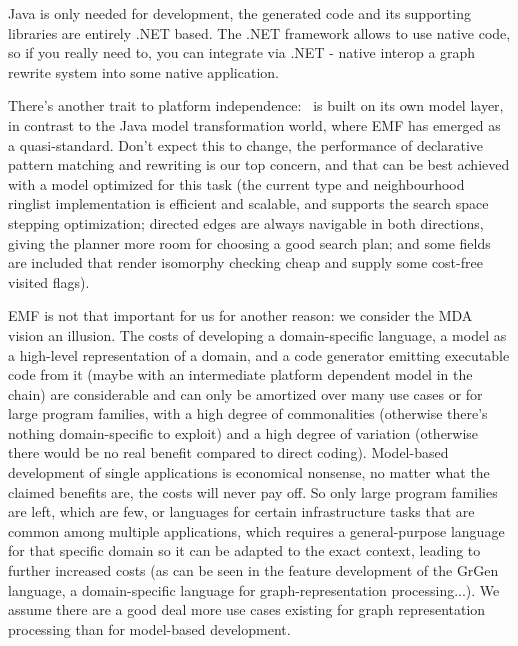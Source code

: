 Java is only needed for development, the generated code and its supporting libraries are entirely .NET based.
The .NET framework allows to use native code, so if you really need to, you can integrate via .NET - native interop a graph rewrite system into some native application.

There's another trait to platform independence: \GrG\ is built on its own model layer, in contrast to the Java model transformation world, where EMF has emerged as a quasi-standard.
Don't expect this to change, the performance of declarative pattern matching and rewriting is our top concern, and that can be best achieved with a model optimized for this task (the current type and neighbourhood ringlist implementation is efficient and scalable, and supports the search space stepping optimization; directed edges are always navigable in both directions, giving the planner more room for choosing a good search plan; and some fields are included that render isomorphy checking cheap and supply some cost-free visited flags).

EMF is not that important for us for another reason: we consider the MDA vision an illusion.
The costs of developing a domain-specific language, a model as a high-level representation of a domain, and a code generator emitting executable code from it (maybe with an intermediate platform dependent model in the chain) are considerable and can only be amortized over many use cases or for large program families, with a high degree of commonalities (otherwise there's nothing domain-specific to exploit) and a high degree of variation (otherwise there would be no real benefit compared to direct coding).
Model-based development of single applications is economical nonsense, no matter what the claimed benefits are, the costs will never pay off.
So only large program families are left, which are few, or languages for certain infrastructure tasks that are common among multiple applications, which requires a general-purpose language for that specific domain so it can be adapted to the exact context, leading to further increased costs (as can be seen in the feature development of the GrGen language, a domain-specific language for graph-representation processing...).
We assume there are a good deal more use cases existing for graph representation processing than for model-based development.

